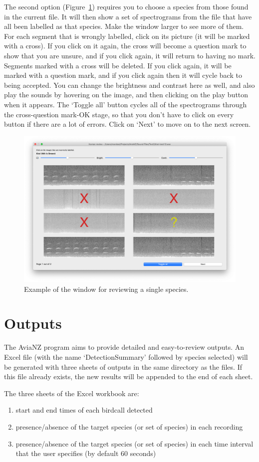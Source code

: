 \documentclass{article}
\begin{document}
The second option (Figure~\ref{check2}) requires you to choose a species from those found in the current file. It will then show a set of spectrograms from the file that have all been labelled as that species. Make the window larger to see more of them. For each segment that is wrongly labelled, click on its picture (it will be marked with a cross). If you click on it again, the cross will become a question mark to show that you are unsure, and if you click again, it will return to having no mark. Segments marked with a cross will be deleted. If you click again, it will be marked with a question mark, and if you click again then it will cycle back to being accepted. You can change the brightness and contrast here as well, and also play the sounds by hovering on the image, and then clicking on the play button when it appears. The `Toggle all' button cycles all of the spectrograms through the cross-question mark-OK stage, so that you don't have to click on every button if there are a lot of errors. Click on `Next' to move on to the next screen. 

	\begin{figure}
	\centering
	\includegraphics[width=.4\textwidth]{Figs/review2}
	\caption{Example of the window for reviewing a single species.}
	\label{check2}
	\end{figure}

\section{Outputs}
\label{sec:outputs}

The AviaNZ program aims to provide detailed and easy-to-review outputs. An Excel file (with the name `DetectionSummary' followed by species selected) will be generated with three sheets of outputs in the same directory as the files. If this file already exists, the new results will be appended to the end of each sheet. 

The three sheets of the Excel workbook are:
\begin{enumerate}
\item start and end times of each birdcall detected
\item presence/absence of the target species (or set of species) in each recording
\item  presence/absence of the target species (or set of species) in each time interval that the user specifies (by default 60 seconds)
\end{enumerate}
\end{document}
